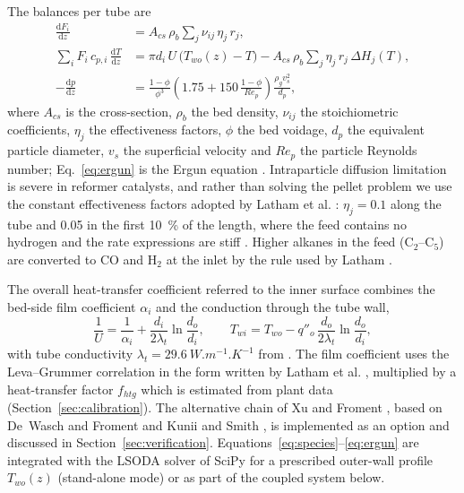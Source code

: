 The balances per tube are
\begin{align}
\frac{\mathrm{d}F_i}{\mathrm{d}z} &= A_{cs}\,\rho_b \sum_j \nu_{ij}\,\eta_j\,r_j, \label{eq:species}\\
\sum_i F_i\,c_{p,i}\,\frac{\mathrm{d}T}{\mathrm{d}z} &= \pi d_i\,U\,\bigl(T_{wo}(z) - T\bigr) - A_{cs}\,\rho_b \sum_j \eta_j\,r_j\,\Delta H_j(T), \label{eq:energy}\\
-\frac{\mathrm{d}p}{\mathrm{d}z} &= \frac{1-\phi}{\phi^{3}}\left(1.75 + 150\,\frac{1-\phi}{Re_p}\right)\frac{\rho_g v_s^{2}}{d_p}, \label{eq:ergun}
\end{align}
where $A_{cs}$ is the cross-section, $\rho_b$ the bed density, $\nu_{ij}$ the stoichiometric coefficients, $\eta_j$ the effectiveness
factors, $\phi$ the bed voidage, $d_p$ the equivalent particle diameter, $v_s$ the superficial velocity and $Re_p$ the particle
Reynolds number; Eq.~\eqref{eq:ergun} is the Ergun equation \cite{ergun1952}. Intraparticle diffusion limitation is severe in
reformer catalysts, and rather than solving the pellet problem we use the constant effectiveness factors adopted by Latham et al.
\cite{latham2011}: $\eta_j = 0.1$ along the tube and 0.05 in the first \SI{10}{\percent} of the length, where the feed contains
no hydrogen and the rate expressions are stiff .
Higher alkanes in the feed (C$_2$--C$_5$) are converted to CO and H$_2$ at the inlet by the rule used by Latham
\cite{latham2008} .

The overall heat-transfer coefficient referred to the inner surface combines the bed-side film coefficient $\alpha_i$ and the
conduction through the tube wall,
\begin{equation}
\frac{1}{U} = \frac{1}{\alpha_i} + \frac{d_i}{2\lambda_t}\ln\frac{d_o}{d_i}, \qquad
T_{wi} = T_{wo} - q''_o\,\frac{d_o}{2\lambda_t}\ln\frac{d_o}{d_i},
\label{eq:U}
\end{equation}
with tube conductivity $\lambda_t = \SI{29.6}{W.m^{-1}.K^{-1}}$ from \cite{latham2008}. The film coefficient uses the Leva--Grummer
correlation \cite{leva1948} in the form written by Latham et al. \cite{latham2011}, multiplied by a heat-transfer factor
$f_{htg}$ which is estimated from plant data (Section~\ref{sec:calibration}). The alternative chain of Xu and Froment
\cite{xu1989b}, based on De~Wasch and Froment \cite{dewasch1972} and Kunii and Smith \cite{kunii1960}, is implemented as an option
and discussed in Section~\ref{sec:verification}. Equations~\eqref{eq:species}--\eqref{eq:ergun} are integrated with the LSODA solver of
SciPy for a prescribed outer-wall profile $T_{wo}(z)$ (stand-alone mode) or as part of the coupled system below.

